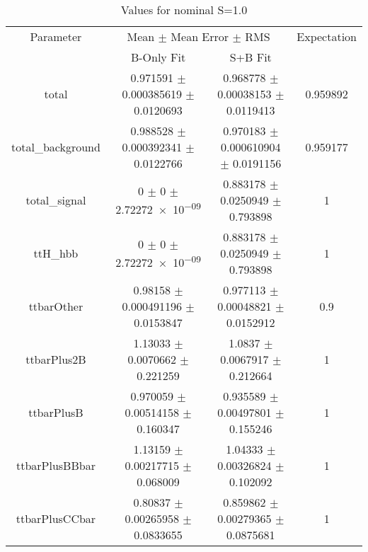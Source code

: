 \begin{table}
\centering
\caption{Values for nominal S=1.0}
\begin{tabular}{cccc}
\toprule
Parameter & \multicolumn{2}{c}{Mean $\pm$ Mean Error $\pm$ RMS} & Expectation\\
 & B-Only Fit & S+B Fit & \\
\midrule
total & \num{0.971591} $\pm$ \num{0.000385619} $\pm$ \num{0.0120693} & \num{0.968778} $\pm$ \num{0.00038153} $\pm$ \num{0.0119413} & \num{0.959892}\\
total\_background & \num{0.988528} $\pm$ \num{0.000392341} $\pm$ \num{0.0122766} & \num{0.970183} $\pm$ \num{0.000610904} $\pm$ \num{0.0191156} & \num{0.959177}\\
total\_signal & \num{0} $\pm$ \num{0} $\pm$ \num{2.72272e-09} & \num{0.883178} $\pm$ \num{0.0250949} $\pm$ \num{0.793898} & \num{1}\\
ttH\_hbb & \num{0} $\pm$ \num{0} $\pm$ \num{2.72272e-09} & \num{0.883178} $\pm$ \num{0.0250949} $\pm$ \num{0.793898} & \num{1}\\
ttbarOther & \num{0.98158} $\pm$ \num{0.000491196} $\pm$ \num{0.0153847} & \num{0.977113} $\pm$ \num{0.00048821} $\pm$ \num{0.0152912} & \num{0.9}\\
ttbarPlus2B & \num{1.13033} $\pm$ \num{0.0070662} $\pm$ \num{0.221259} & \num{1.0837} $\pm$ \num{0.0067917} $\pm$ \num{0.212664} & \num{1}\\
ttbarPlusB & \num{0.970059} $\pm$ \num{0.00514158} $\pm$ \num{0.160347} & \num{0.935589} $\pm$ \num{0.00497801} $\pm$ \num{0.155246} & \num{1}\\
ttbarPlusBBbar & \num{1.13159} $\pm$ \num{0.00217715} $\pm$ \num{0.068009} & \num{1.04333} $\pm$ \num{0.00326824} $\pm$ \num{0.102092} & \num{1}\\
ttbarPlusCCbar & \num{0.80837} $\pm$ \num{0.00265958} $\pm$ \num{0.0833655} & \num{0.859862} $\pm$ \num{0.00279365} $\pm$ \num{0.0875681} & \num{1}\\
\bottomrule
\end{tabular}
\end{table}